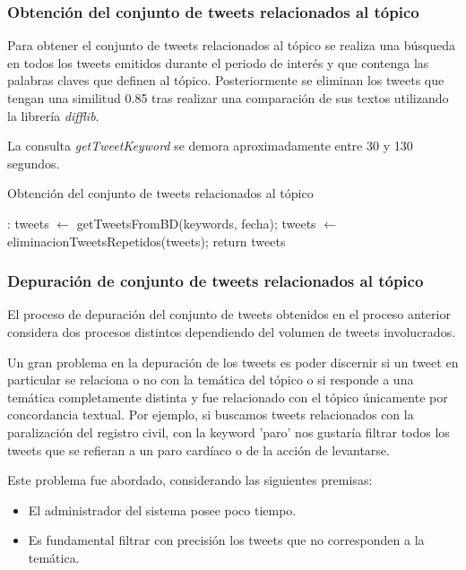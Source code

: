 \subsubsection{Obtención del conjunto de tweets relacionados al tópico}

Para obtener el conjunto de tweets relacionados al tópico se realiza una búsqueda en todos los tweets emitidos durante el periodo de interés
y que contenga las palabras claves que definen al tópico. Posteriormente se eliminan los tweets que tengan una similitud 0.85 tras realizar 
una comparación de sus textos utilizando la librería \emph{difflib}.

La consulta \emph{getTweetKeyword} se demora aproximadamente entre 30 y 130 segundos.

\begin{algorithm}[H]
	\caption{Obtención del conjunto de tweets relacionados al tópico}\label{getTweetsKeyword}
	\begin{algorithmic}[1]
		
		:
		\State tweets $\gets$ getTweetsFromBD(keywords, fecha);
		\State tweets $\gets$ eliminacionTweetsRepetidos(tweets);
		\State return tweets
		\EndFunction
	\end{algorithmic}
\end{algorithm}	



\subsubsection{Depuración de conjunto de tweets relacionados al tópico}

El proceso de depuración del conjunto de tweets obtenidos en el proceso anterior considera dos procesos distintos dependiendo del volumen de tweets involucrados.

Un gran problema en la depuración de los tweets es poder discernir si un tweet en particular se relaciona o no con la temática del tópico o si responde a una temática completamente distinta y fue relacionado con el tópico únicamente por concordancia textual. Por ejemplo, si buscamos tweets relacionados con la paralización del registro civil, con la keyword 'paro' nos gustaría filtrar todos los tweets que se refieran a un paro cardíaco o de la acción de levantarse.

Este problema fue abordado, considerando las siguientes premisas:
\begin{itemize}
	\item El administrador del sistema posee poco tiempo.
	\item Es fundamental filtrar con precisión los tweets que no corresponden a la temática.
\end{itemize}

